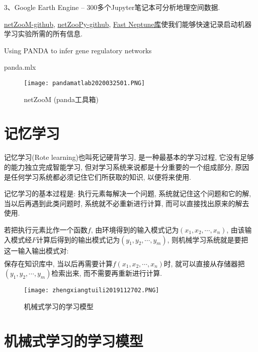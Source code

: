 3、Google Earth Engine – 300多个Jupyter笔记本可分析地理空间数据.

\href{https://github.com/netZoo/netZooM}{netZooM-github}, \href{https://github.com/netZoo/netZooPy}{netZooPy-github}, \href{https://github.com/DanyWind/fast_neptune}{Fast Neptune库}使我们能够快速记录启动机器学习实验所需的所有信息.

Using PANDA to infer gene regulatory networks

panda.mlx
\begin{figure}[H]
\centering
\texttt{[image: pandamatlab2020032501.PNG]}
\caption{netZooM (panda工具箱)}
\label{pandamatlab2020032501}
\vspace{-0.5cm}
\end{figure}
\section{记忆学习}

记忆学习(Rote learning)也叫死记硬背学习, 是一种最基本的学习过程, 它没有足够的能力独立完成智能学习, 但对学习系统来说都是十分重要的一个组成部分, 原因是任何学习系统都必须记住它们所获取的知识, 以便将来使用.

记忆学习的基本过程是: 执行元素每解决一个问题, 系统就记住这个问题和它的解, 当以后再遇到此类问题时, 系统就不必重新进行计算, 而可以直接找出原来的解去使用.

若把执行元素比作一个函数$f$, 由环境得到的输入模式记为$(x_1,x_2,\cdots ,x_n)$, 由该输入模式经$F$计算后得到的输出模式记为$(y_1,y_2,\cdots ,y_m)$, 则机械学习系统就是要把这一输入输出模式对:
\begin{align}
  [(x_1,x_2,\cdots ,x_n) , (y_1,y_2,\cdots ,y_m)]
\end{align}
保存在知识库中, 当以后再需要计算$f(x_1,x_2,\cdots ,x_n)$时, 就可以直接从存储器把$(y_1,y_2,\cdots ,y_m)$检索出来, 而不需要再重新进行计算.
\begin{figure}[H]
\centering
\texttt{[image: zhengxiangtuili2019112702.PNG]}
\caption{机械式学习的学习模型}
\label{AI32fig2702}
\end{figure}
\section{机械式学习的学习模型}
